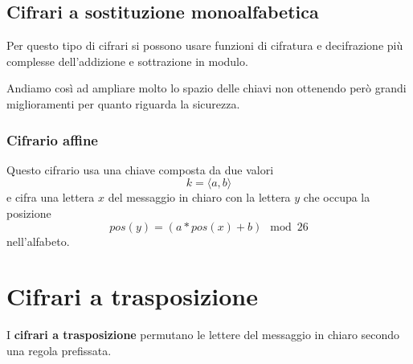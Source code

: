 \subsection{Cifrari a sostituzione monoalfabetica}
Per questo tipo di cifrari si possono usare funzioni di cifratura e decifrazione pi\`u complesse dell'addizione e
sottrazione in modulo.

Andiamo cos\`i ad ampliare molto lo spazio delle chiavi non ottenendo per\`o grandi  miglioramenti per quanto
riguarda la sicurezza.

\subsubsection{Cifrario affine}
Questo cifrario usa una chiave composta da due valori
\[ k = \langle a, b \rangle \]
e cifra una lettera $x$ del messaggio in chiaro con la lettera $y$ che occupa la posizione
\[ pos(y) = (a * pos(x) + b) \mod{26} \]
nell'alfabeto.

\section{Cifrari a trasposizione}
I \textbf{cifrari a trasposizione} permutano le lettere del messaggio in chiaro secondo una regola prefissata.
